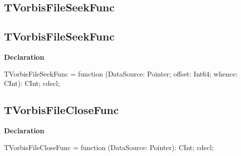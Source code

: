 \documentclass{report}
\newif\ifpdf
\begin{document}
\subsection*{\large{\textbf{TVorbisFileSeekFunc}}\normalsize\hspace{1ex}\hrulefill}
\else
\subsection*{TVorbisFileSeekFunc}
\fi
\label{ok_vorbisfile-TVorbisFileSeekFunc}
\begin{list}{}{
\setlength{\itemindent}{0cm}
\setlength{\listparindent}{0cm}
\setlength{\leftmargin}{\evensidemargin}
\addtolength{\leftmargin}{\tmplength}
\settowidth{\labelsep}{X}
\addtolength{\leftmargin}{\labelsep}
\setlength{\labelwidth}{\tmplength}
}
\item[\textbf{Declaration}\hfill]
\ifpdf
\begin{flushleft}
\fi
\begin{ttfamily}
TVorbisFileSeekFunc = function (DataSource: Pointer; offset: Int64; whence: CInt): CInt; cdecl;\end{ttfamily}

\ifpdf
\end{flushleft}
\fi

\end{list}
\ifpdf
\subsection*{\large{\textbf{TVorbisFileCloseFunc}}\normalsize\hspace{1ex}\hrulefill}
\else
\subsection*{TVorbisFileCloseFunc}
\fi
\label{ok_vorbisfile-TVorbisFileCloseFunc}
\begin{list}{}{
\setlength{\itemindent}{0cm}
\setlength{\listparindent}{0cm}
\setlength{\leftmargin}{\evensidemargin}
\addtolength{\leftmargin}{\tmplength}
\settowidth{\labelsep}{X}
\addtolength{\leftmargin}{\labelsep}
\setlength{\labelwidth}{\tmplength}
}
\item[\textbf{Declaration}\hfill]
\ifpdf
\begin{flushleft}
\fi
\begin{ttfamily}
TVorbisFileCloseFunc = function (DataSource: Pointer): CInt; cdecl;\end{ttfamily}

\ifpdf
\end{flushleft}
\fi

\end{list}
\ifpdf
\end{document}
